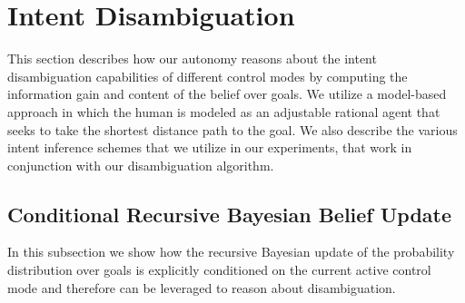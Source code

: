 \documentclass[conference]{IEEEtran}
\begin{document}
\section{Intent Disambiguation}\label{sec:disamb}
This section describes how our autonomy reasons about the intent disambiguation capabilities of different control modes by computing the information gain and content of the belief over goals. We utilize a model-based approach in which the human is modeled as an adjustable rational agent that seeks to take the shortest distance path to the goal. 
We also describe the various intent inference schemes that we utilize in our experiments, that work in conjunction with our disambiguation algorithm. 


\subsection{Conditional Recursive Bayesian Belief Update}

In this subsection we show how the recursive Bayesian update of the probability distribution over goals is explicitly conditioned on the current active control mode and therefore can be leveraged to reason about disambiguation.
\end{document}
